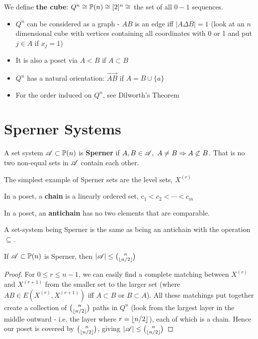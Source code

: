\documentclass[a4paper]{article}
\begin{document}
{\begin{defi}
	We define \textbf{the cube}: $Q^n\cong\P(n)\cong[2]^n\cong$ the set of all $0-1$ sequences.
\end{defi}
\begin{rem}
	\begin{itemize}
		\item $Q^n$ can be considered as a graph - $AB$ is an edge iff $|A\Delta B|=1$ (look at an $n$ dimensional cube with vertices containing all coordinates with 0 or 1 and put $j\in A$ if $x_j=1$)\\
		\item It is also a poset via $A<B$ if $A\subset B$
		\item $Q^n$ has a natural orientation: $\overrightarrow{AB}$ if $A=B\cup\{a\}$
		\item For the order induced on $Q^n$, see Dilworth's Theorem
	\end{itemize}
\end{rem}

\section{Sperner Systems}
\begin{defi}[Sperner]
	A set system $\A\subset\P(n)$ is \textbf{Sperner} if $A,B\in\A,\ A\neq B\Rightarrow A\not\subset B$. That is no two non-equal sets in $\A$ contain each other.
\end{defi}

The simplest example of Sperner sets are the level sets, $X^{(r)}$

\begin{defi}[Chain]
	In a poset, a \textbf{chain} is a linearly ordered set, $c_1<c_2<\cdots<c_m$
\end{defi}

\begin{defi}[Antichain]
	In a poset, an \textbf{antichain} has no two elements that are comparable.
\end{defi}

A set-system being Sperner is the same as being an antichain with the operation $\subseteq$.

\begin{thm-num}[Sperner, 1928]
	If $\A\subset\P(n)$ is Sperner, then $|\A|\leq\binom{n}{\lf n/2\rf}$
\end{thm-num}
\begin{proof}
	For $0\leq r\leq n-1$, we can easily find a complete matching between $X^{(r)}$ and $X^{(r+1)}$ from the smaller set to the larger set (where $AB\in E\left(X^{(r)},X^{(r+1)}\right)$ iff $A\subset B$ or $B\subset A$). All these matchings put together create a collection of $\binom{n}{\lf n/2\rf}$ paths in $Q^n$ (look from the largest layer in the middle outward - i.e. the layer where $r=\lf n/2\rf$), each of which is a chain. Hence our poset is covered by $\binom{n}{\lf n/2\rf}$, giving $|\A|\leq\binom{n}{\lf n/2\rf}$
\end{proof}

}
\end{document}
